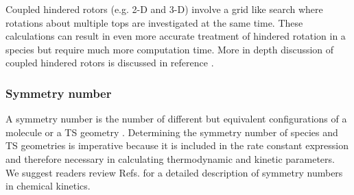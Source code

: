 \documentclass[preprint, 11pt]{elsarticle} %
\begin{document}
Coupled hindered rotors (e.g. 2-D and 3-D) involve a grid like search where rotations about multiple tops are investigated at the same time. 
These calculations can result in even more accurate treatment of hindered rotation in a species but require much more computation time.
More in depth discussion of coupled hindered rotors is discussed in reference \cite{fernandez:2013}.


\subsubsection{Symmetry number}

A symmetry number is the number of different but equivalent configurations of a molecule or a TS geometry \cite{gilson:2010}.
Determining the symmetry number of species and TS geometries is imperative because it is included in the rate constant expression and therefore necessary in calculating thermodynamic and kinetic parameters.
We suggest readers review Refs. \cite{FernandezRamos:2007, Pollak:1978} for a detailed description of symmetry numbers in chemical kinetics.
\end{document}
